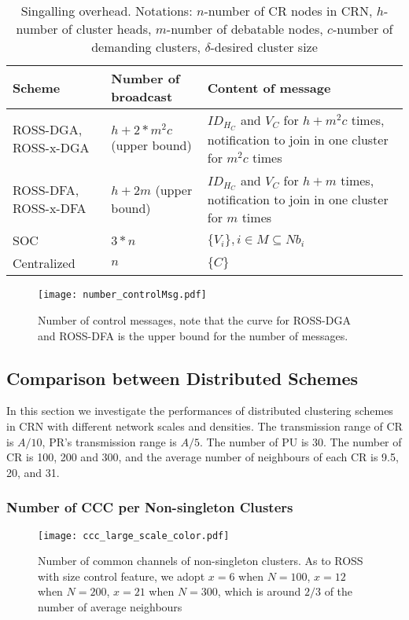 \begin{table}[hc]
\center
\begin{tabular}{|p{3 cm}|p{3 cm}|p{7.5 cm}|}
\hline
 Scheme 		&   Number of broadcast  	& Content of message \\ \hline
 ROSS-DGA, ROSS-x-DGA 		&   $h+2*m^2c$  (upper bound)				& $ID_{H_C}$ and $V_C$ for $h+m^2c$ times, notification to join in one cluster for $m^2c$ times					\\ \hline
 ROSS-DFA, ROSS-x-DFA 		&   $h+ 2m$	 (upper bound)				& $ID_{H_C}$ and $V_C$ for $h+m$ times, notification to join in one cluster for $m$ times	 					\\ \hline
 SOC 			&   $3*n$					& $\{V_i\}, i\in M\subseteq Nb_i$						\\ \hline
 Centralized	&	$n$						& $\{C\}$         	\\ \hline
\end{tabular}
\caption{Singalling overhead. Notations: $n$-number of CR nodes in CRN, $h$-number of cluster heads, $m$-number of debatable nodes, $c$-number of demanding clusters, $\delta$-desired cluster size}
\label{tab_overhead}
\end{table}


\begin{figure}[ht!]
  \centering
  \texttt{[image: number\_controlMsg.pdf]}
  \caption{Number of control messages, note that the curve for ROSS-DGA and ROSS-DFA is the upper bound for the number of messages.}
  \label{control_msg}
\end{figure}


\subsection{Comparison between Distributed Schemes}
In this section we investigate the performances of distributed clustering schemes in CRN with different network scales and densities.
The transmission range of CR is $A/10$, PR's transmission range is $A/5$.
The number of PU is 30.
The number of CR is 100, 200 and 300, and the average number of neighbours of each CR is 9.5, 20, and 31.


\subsubsection{Number of CCC per Non-singleton Clusters}

\begin{figure}[ht!]
  \centering
  \texttt{[image: ccc\_large\_scale\_color.pdf]}
  \caption{Number of common channels of non-singleton clusters. As to ROSS with size control feature, we adopt $x=6$ when $N=100$, $x=12$ when $N=200$, $x=21$ when $N=300$, which is around $2/3$ of the number of average neighbours}
  \label{ccc_large_scale}
\end{figure}

